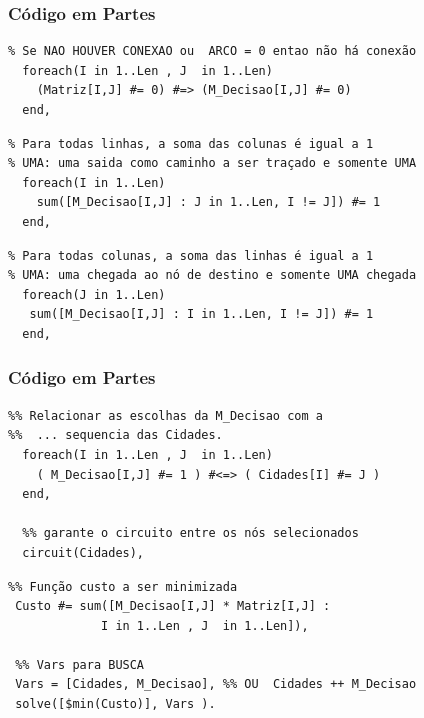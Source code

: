 \begin{frame}[fragile] 

\frametitle{Código em Partes}

\begin{footnotesize}
\begin{verbatim}
% Se NAO HOUVER CONEXAO ou  ARCO = 0 entao não há conexão
  foreach(I in 1..Len , J  in 1..Len)
    (Matriz[I,J] #= 0) #=> (M_Decisao[I,J] #= 0)
  end,    
\end{verbatim}
\end{footnotesize}
\pause

\begin{footnotesize}
\begin{verbatim}
% Para todas linhas, a soma das colunas é igual a 1
% UMA: uma saida como caminho a ser traçado e somente UMA
  foreach(I in 1..Len)
    sum([M_Decisao[I,J] : J in 1..Len, I != J]) #= 1
  end,     
\end{verbatim}
\end{footnotesize}

\pause

\begin{footnotesize}
\begin{verbatim}
% Para todas colunas, a soma das linhas é igual a 1  
% UMA: uma chegada ao nó de destino e somente UMA chegada
  foreach(J in 1..Len)
   sum([M_Decisao[I,J] : I in 1..Len, I != J]) #= 1
  end,     
\end{verbatim}
\end{footnotesize}    
    
\end{frame}

\begin{frame}[fragile] 
\frametitle{Código em Partes}
\begin{footnotesize}
\begin{verbatim}
%% Relacionar as escolhas da M_Decisao com a
%%  ... sequencia das Cidades. 
  foreach(I in 1..Len , J  in 1..Len)
    ( M_Decisao[I,J] #= 1 ) #<=> ( Cidades[I] #= J )
  end,    
 
  %% garante o circuito entre os nós selecionados
  circuit(Cidades),
 \end{verbatim}
\end{footnotesize}
\pause

\begin{footnotesize}
\begin{verbatim}
%% Função custo a ser minimizada
 Custo #= sum([M_Decisao[I,J] * Matriz[I,J] : 
             I in 1..Len , J  in 1..Len]),

 %% Vars para BUSCA
 Vars = [Cidades, M_Decisao], %% OU  Cidades ++ M_Decisao
 solve([$min(Custo)], Vars ).
\end{verbatim}
\end{footnotesize}    
    
\end{frame}



